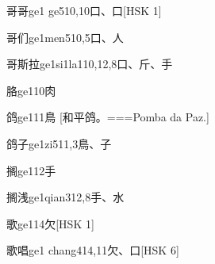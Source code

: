 \begin{EntryWithPhonetic}{哥哥}{ge1 ge5}{10,10}{⼝、⼝}[HSK 1]
\end{EntryWithPhonetic}

\begin{EntryWithPhonetic}{哥们}{ge1men5}{10,5}{⼝、⼈}
\end{EntryWithPhonetic}

\begin{EntryWithPhonetic}{哥斯拉}{ge1si1la1}{10,12,8}{⼝、⽄、⼿}
\end{EntryWithPhonetic}

\begin{EntryWithPhonetic}{胳}{ge1}{10}{⾁}
\end{EntryWithPhonetic}

\begin{EntryWithPhonetic}{鸽}{ge1}{11}{⿃}
  [和平鸽。===Pomba da Paz.]
\end{EntryWithPhonetic}

\begin{EntryWithPhonetic}{鸽子}{ge1zi5}{11,3}{⿃、⼦}
\end{EntryWithPhonetic}

\begin{EntryWithPhonetic}{搁}{ge1}{12}{⼿}
\end{EntryWithPhonetic}

\begin{EntryWithPhonetic}{搁浅}{ge1qian3}{12,8}{⼿、⽔}
\end{EntryWithPhonetic}

\begin{EntryWithPhonetic}{歌}{ge1}{14}{⽋}[HSK 1]
\end{EntryWithPhonetic}

\begin{EntryWithPhonetic}{歌唱}{ge1 chang4}{14,11}{⽋、⼝}[HSK 6]
\end{EntryWithPhonetic}

